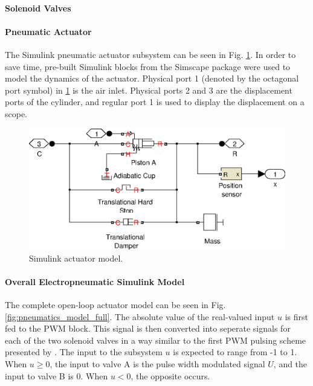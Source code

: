 \paragraph{Solenoid Valves}



\paragraph{Pneumatic Actuator}

The Simulink pneumatic actuator subsystem can be seen in Fig. \ref{fig:pneumatics_actuator}. In order to save time, pre-built Simulink blocks from the Simscape package were used to model the dynamics of the actuator. Physical port 1 (denoted by the octagonal port symbol) in \ref{fig:pneumatics_actuator} is the air inlet. Physical ports 2 and 3 are the displacement ports of the cylinder, and regular port 1 is used to display the displacement on a scope.

\begin{figure}[H]
\centering
\includegraphics[scale=0.65]{implementation/figures/pneumatic_modelling3}
\caption{Simulink actuator model.}
\label{fig:pneumatics_actuator}
\end{figure}

\paragraph{Overall Electropneumatic Simulink Model}

The complete open-loop actuator model can be seen in Fig. \ref{fig:pneumatics_model_full}. The absolute value of the real-valued input $u$ is first fed to the PWM block. This signal is then converted into seperate signals for each of the two solenoid valves in a way similar to the first PWM pulsing scheme presented by \citet{accurate_position}. The input to the subsystem $u$ is expected to range from -1 to 1. When $u\geq0$, the input to valve A is  the pulse width modulated signal $U$, and the input to valve B is 0. When $u<0$, the opposite occurs.


